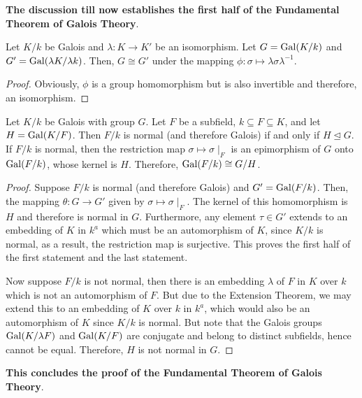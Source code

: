 \textbf{The discussion till now establishes the first half of the Fundamental Theorem of Galois Theory}.

\begin{lemma}
    Let $K/k$ be Galois and $\lambda: K\to K'$ be an isomorphism. Let $G = \operatorname{Gal}(K/k)$ and $G' = \operatorname{Gal}(\lambda K/\lambda k)$. Then, $G\cong G'$ under the mapping $\phi: \sigma\mapsto\lambda\sigma\lambda^{-1}$.
\end{lemma}
\begin{proof}
    Obviously, $\phi$ is a group homomorphism but is also invertible and therefore, an isomorphism.
\end{proof}

\begin{theorem}
    Let $K/k$ be Galois with group $G$. Let $F$ be a subfield, $k\subseteq F\subseteq K$, and let $H = \operatorname{Gal}(K/F)$. Then $F/k$ is normal (and therefore Galois) if and only if $H\unlhd G$. If $F/k$ is normal, then the restriction map $\sigma\mapsto\sigma\mid_F$ is an epimorphism of $G$ onto $\operatorname{Gal}(F/k)$, whose kernel is $H$. Therefore, $\operatorname{Gal}(F/k)\cong G/H$.
\end{theorem}
\begin{proof}
    Suppose $F/k$ is normal (and therefore Galois) and $G' = \operatorname{Gal}(F/k)$. Then, the mapping $\theta: G\to G'$ given by $\sigma\mapsto\sigma\mid_F$. The kernel of this homomorphism is $H$ and therefore is normal in $G$. Furthermore, any element $\tau\in G'$ extends to an embedding of $K$ in $k^a$ which must be an automorphism of $K$, since $K/k$ is normal, as a result, the restriction map is surjective. This proves the first half of the first statement and the last statement.

    Now suppose $F/k$ is not normal, then there is an embedding $\lambda$ of $F$ in $K$ over $k$ which is not an automorphism of $F$. But due to the Extension Theorem, we may extend this to an embedding of $K$ over $k$ in $k^a$, which would also be an automorphism of $K$ since $K/k$ is normal. But note that the Galois groups $\operatorname{Gal}(K/\lambda F)$ and $\operatorname{Gal}(K/F)$ are conjugate and belong to distinct subfields, hence cannot be equal. Therefore, $H$ is not normal in $G$.
\end{proof}

\textbf{This concludes the proof of the Fundamental Theorem of Galois Theory}.